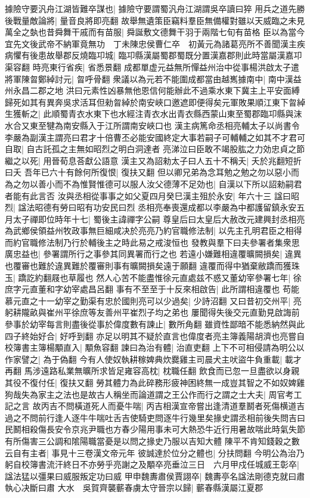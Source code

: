 據險守要汎舟江湖皆難卒謀也|{
	據險守要謂蜀汎舟江湖謂吳卒讀曰猝}
用兵之道先勝後戰量敵論將|{
	量音良將即亮翻}
故舉無遺策臣竊料羣臣無備權對雖以天威臨之未見萬全之埶也昔舜舞干戚而有苗服|{
	舜誕敷文德舞干羽于兩階七旬有苗格}
臣以為當今宜先文後武帝不納軍竟無功　丁未陳忠侯曹仁卒　初黃元為諸葛亮所不善聞漢主疾病懼有後患故舉郡反燒臨卭城|{
	臨卭縣漢屬蜀郡蜀既分置漢嘉郡則此時當屬漢嘉卭渠容翻}
時亮東行省疾|{
	省悉景翻}
成都單虚元益無所憚益州治中從事楊洪啟太子遣將軍陳曶鄭綽討元|{
	曶呼骨翻}
衆議以為元若不能圍成都當由越嶲據南中|{
	南中漢益州永昌二郡之地}
洪曰元素性凶暴無他恩信何能辦此不過乘水東下冀主上平安面縛歸死如其有異奔吳求活耳但勑曶綽於南安峽口邀遮即便得矣元軍敗果順江東下曶綽生獲斬之|{
	此順蜀青衣水東下也水經注青衣水出青衣縣西蒙山東至蜀郡臨卭縣與沫水合又東至犍為南安縣入于江所謂南安峽口也}
漢主病篤命丞相亮輔太子以尚書令李嚴為副漢主謂亮曰君才十倍曹丕必能安國終定大事若嗣子可輔輔之如其不才君可自取|{
	自古託孤之主無如昭烈之明白洞達者}
亮涕泣曰臣敢不竭股肱之力効忠貞之節繼之以死|{
	用晉荀息荅獻公語意}
漢主又為詔勑太子曰人五十不稱夭|{
	夭於兆翻短折曰夭}
吾年已六十有餘何所復恨|{
	復扶又翻}
但以卿兄弟為念耳勉之勉之勿以惡小而為之勿以善小而不為惟賢惟德可以服人汝父德薄不足効也|{
	自漢以下所以詔勑嗣君者能有此言否}
汝與丞相從事事之如父夏四月癸巳漢主殂於永安|{
	年六十三}
諡曰昭烈|{
	諡法昭德有勞曰昭有功安民曰烈}
丞相亮奉喪還成都以李嚴為中都護留鎮永安五月太子禪即位時年十七|{
	蜀後主諱禪字公嗣}
尊皇后曰太皇后大赦改元建興封丞相亮為武鄉侯領益州牧政事無巨細咸决於亮亮乃約官職修法制|{
	以先主孔明君臣之相得而約官職修法制乃行於輔後主之時此易之戒浚恒也}
發教與羣下曰夫參署者集衆思廣忠益也|{
	參署謂所行之事參其同異署而行之也}
若遠小嫌難相違覆曠闕損矣|{
	違異也覆審也難於違異難於覆審則事有曠闕損矣遠于願翻}
違覆而得中猶棄敝蹻而獲珠玉|{
	蹻訖約翻屐也草履也}
然人心苦不能盡惟徐元直處兹不惑又董幼宰參署七年|{
	徐庶字元直董和字幼宰處昌呂翻}
事有不至至于十反來相啟告|{
	此所謂相違覆也}
苟能慕元直之十一幼宰之勤渠有忠於國則亮可以少過矣|{
	少詩沼翻}
又曰昔初交州平|{
	亮躬耕隴畝與崔州平徐庶等友善州平崔烈子均之弟也}
屢聞得失後交元直勤見啟誨前參事於幼宰每言則盡後從事於偉度數有諫止|{
	數所角翻}
雖資性鄙暗不能悉納然與此四子終始好合|{
	好呼到翻}
亦足以明其不疑於直言也偉度者亮主簿義陽胡濟也亮嘗自校簿書主簿楊顒直入|{
	顒魚容翻}
諫曰為治有體|{
	治直吏翻}
上下不可相侵請為明公以作家譬之|{
	為于偽翻}
今有人使奴執耕稼婢典炊爨雞主司晨犬主吠盜牛負重載|{
	載才再翻}
馬涉遠路私業無曠所求皆足雍容高枕|{
	枕職任翻}
飲食而已忽一旦盡欲以身親其役不復付任|{
	復扶又翻}
勞其體力為此碎務形疲神困終無一成豈其智之不如奴婢雞狗哉失為家主之法也是故古人稱坐而論道謂之王公作而行之謂之士大夫|{
	周官考工記之言}
故丙吉不問橫道死人而憂牛喘|{
	丙吉相漢宣帝嘗出逢清道羣鬭者死傷横道吉過之不問前行逢人逐牛牛喘吐舌吉使騎吏問逐牛行幾里矣掾史謂丞相前後失問吉曰民鬭相殺傷長安令京兆尹職也方春少陽用事未可大熱恐牛近行用暑故喘此時氣失節有所傷害三公調和隂陽職當憂是以問之掾史乃服以吉知大體}
陳平不肯知錢穀之數云自有主者|{
	事見十三卷漢文帝元年}
彼誠達於位分之體也|{
	分扶問翻}
今明公為治乃躬自校簿書流汗終日不亦勞乎亮謝之及顒卒亮垂泣三日　六月甲戍任城威王彰卒|{
	諡法猛以彊果曰威服叛定功曰威}
甲申魏夀肅侯賈詡卒|{
	魏夀亭名諡法剛德克就曰肅執心决斷曰肅}
大水　吳賀齊襲蘄春虜太守晉宗以歸|{
	蘄春縣漢屬江夏郡}


